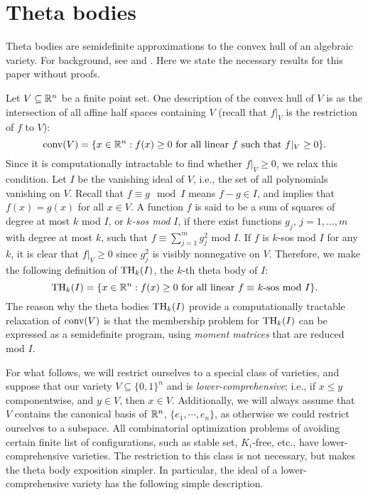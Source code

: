 \section{Theta bodies}
Theta bodies are semidefinite approximations to the convex hull of an algebraic variety. For background, see \cite{frg} and \cite{gpt}. Here we state the necessary results for this paper without proofs.

Let $V \subseteq \mathbb{R}^n$ be a finite point set. One description of the convex hull of $V$ is as the intersection of all affine half spaces containing $V$ (recall that $f|_V$ is the restriction of $f$ to $V$):
$$\hbox{conv}(V) = \{x \in \mathbb{R}^n: f(x) \ge 0 \hbox{ for all linear $f$ such that } f|_V \ge 0\}.$$
Since it is computationally intractable to find whether $f|_V \ge 0$, we relax this condition. Let $I$ be the vanishing ideal of $V$, i.e., the set of all polynomials vanishing on $V$. Recall that $f \equiv g \mod I$ means $f - g \in I$, and implies that $f(x) = g(x)$ for all $x \in V$. A function $f$ is said to be a sum of squares of degree at most $k$ mod $I$, or {\em $k$-sos mod $I$}, if there exist functions $g_j$, $j=1,\ldots,m$ with degree at most $k$, such that $f \equiv \sum_{j=1}^mg_j^2$ mod $I$. If $f$ is $k$-sos mod $I$ for any $k$, it is clear that $f|_V \ge 0$ since $g_j^2$ is visibly nonnegative on $V$. Therefore, we make the following definition of $\textup{TH}_k(I)$, the $k$-th theta body of $I$:
$$\textup{TH}_k(I) = \{x \in \mathbb{R}^n: f(x) \ge 0 \hbox{ for all linear $f \equiv$ $k$-sos mod $I$}\}.$$
The reason why the theta bodies $\textup{TH}_k(I)$ provide a computationally tractable relaxation of $\hbox{conv}(V)$ is that the membership problem for $\textup{TH}_k(I)$ can be expressed as a semidefinite program, using {\em moment matrices} that are reduced mod $I$. 

For what follows, we will restrict ourselves to a special class of varieties, and suppose that our variety $V \subseteq \{0,1\}^n$ and is {\em lower-comprehensive}; i.e., if $x\le y$ componentwise, and $y \in V$, then $x \in V$. Additionally, we will always assume that $V$ contains the canonical
basis of $\mathbb{R}^n$, $\{e_1, \cdots, e_n\}$, as otherwise we could restrict ourselves to a subspace. All combinatorial optimization problems of avoiding certain finite list of configurations, such as stable set, $K_i$-free, etc., have lower-comprehensive varieties. The restriction to this class is not necessary, but makes the theta body exposition simpler. In particular, the ideal of a lower-comprehensive variety has the following simple description.

